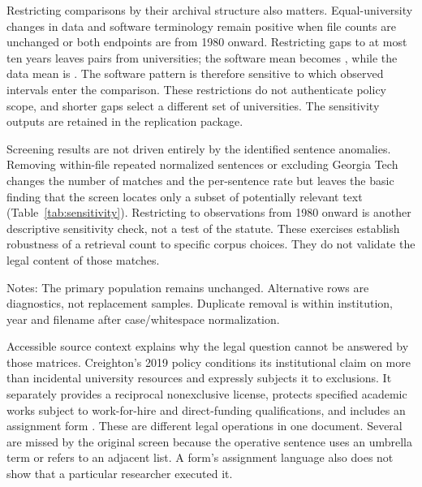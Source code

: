 \documentclass[12pt]{article}
\begin{document}
Restricting comparisons by their archival structure also matters. Equal-university changes in data and software terminology remain positive when file counts are unchanged or both endpoints are from 1980 onward. Restricting gaps to at most ten years leaves \ShortPairs{} pairs from \ShortUniversities{} universities; the software mean becomes \ShortSoftware{}, while the data mean is \ShortData{}. The software pattern is therefore sensitive to which observed intervals enter the comparison. These restrictions do not authenticate policy scope, and shorter gaps select a different set of universities. The sensitivity outputs are retained in the replication package.

Screening results are not driven entirely by the identified sentence anomalies. Removing within-file repeated normalized sentences or excluding Georgia Tech changes the number of matches and the per-sentence rate but leaves the basic finding that the screen locates only a subset of potentially relevant text (Table~\ref{tab:sensitivity}). Restricting to observations from 1980 onward is another descriptive sensitivity check, not a test of the statute. These exercises establish robustness of a retrieval count to specific corpus choices. They do not validate the legal content of those matches.

\begin{table}[htbp]
\centering\caption{Sensitivity of the original screen}\label{tab:sensitivity}
\small
\par\smallskip\footnotesize\raggedright Notes: The primary population remains unchanged. Alternative rows are diagnostics, not replacement samples. Duplicate removal is within institution, year and filename after case/whitespace normalization.
\end{table}

Accessible source context explains why the legal question cannot be answered by those matrices. Creighton's 2019 policy conditions its institutional claim on more than incidental university resources and expressly subjects it to exclusions. It separately provides a reciprocal nonexclusive license, protects specified academic works subject to work-for-hire and direct-funding qualifications, and includes an assignment form \citep[sections C, D.2 and Appendix I]{creighton2019}. These are different legal operations in one document. Several are missed by the original screen because the operative sentence uses an umbrella term or refers to an adjacent list. A form's assignment language also does not show that a particular researcher executed it.
\end{document}
